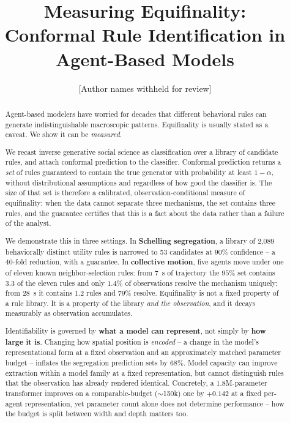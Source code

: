 \documentclass[11pt]{article}
\title{\bfseries Measuring Equifinality:\\
Conformal Rule Identification in Agent-Based Models}
\author{[Author names withheld for review]}
\date{}
\begin{document}
\maketitle

\begin{abstract}
Agent-based modelers have worried for decades that different behavioral rules can
generate indistinguishable macroscopic patterns. Equifinality is usually stated as a
caveat. We show it can be \emph{measured}.

We recast inverse generative social science as classification over a library of
candidate rules, and attach conformal prediction to the classifier. Conformal
prediction returns a \emph{set} of rules guaranteed to contain the true generator
with probability at least $1-\alpha$, without distributional assumptions and
regardless of how good the classifier is. The size of that set is therefore a
calibrated, observation-conditional measure of equifinality: when the data cannot
separate three mechanisms, the set contains three rules, and the guarantee certifies
that this is a fact about the data rather than a failure of the analyst.

We demonstrate this in three settings. In \textbf{Schelling segregation}, a library
of 2,089 behaviorally distinct utility rules is narrowed to 53 candidates at
$90\%$ confidence -- a 40-fold reduction, with a guarantee. In \textbf{collective
motion}, five agents move under one of eleven known neighbor-selection rules: from
\SI{7}{\second} of trajectory the $95\%$ set contains 3.3 of the eleven rules and
only $1.4\%$ of observations resolve the mechanism uniquely; from \SI{28}{\second} it
contains 1.2 rules and $79\%$ resolve. Equifinality is not a fixed property of a rule
library. It is a property of the library \emph{and the observation}, and it decays
measurably as observation accumulates.

Identifiability is governed by \textbf{what a model can represent}, not simply by
\textbf{how large it is}. Changing how spatial position is \emph{encoded} -- a change
in the model's representational form at a fixed observation and an approximately
matched parameter budget -- inflates the segregation prediction sets by $68\%$. Model
capacity can improve extraction within a model family at a fixed representation, but
cannot distinguish rules that the observation has already rendered identical.
Concretely, a 1.8M-parameter transformer improves on a comparable-budget ($\sim$150k)
one by $+0.142$ at a fixed per-agent representation, yet parameter count alone does not
determine performance -- how the budget is split between width and depth matters too.


\end{abstract}
\end{document}
